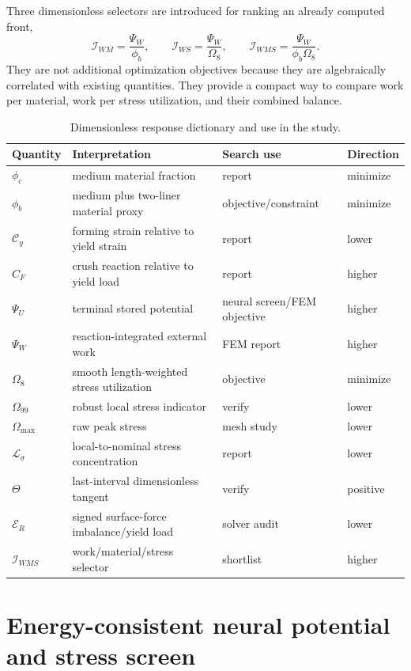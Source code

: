 \documentclass[11pt]{article}
\newcommand{\phib}{\phi_{b}}
\newcommand{\phic}{\phi_{c}}
\newcommand{\PsiU}{\Psi_{U}}
\newcommand{\PsiW}{\Psi_{W}}
\newcommand{\Om}{\Omega_{8}}
\newcommand{\Ommax}{\Omega_{\max}}
\newcommand{\Iws}{\mathcal I_{WMS}}
\begin{document}
Three dimensionless selectors are introduced for ranking an already computed front,
\begin{equation}
\mathcal I_{WM}=\frac{\PsiW}{\phib},\qquad
\mathcal I_{WS}=\frac{\PsiW}{\Om},\qquad
\Iws=\frac{\PsiW}{\phib\Om}.
\label{eq:selectors}
\end{equation}
They are not additional optimization objectives because they are algebraically correlated with existing quantities. They provide a compact way to compare work per material, work per stress utilization, and their combined balance.

\begin{table}[t]
\centering\small
\caption{Dimensionless response dictionary and use in the study.}
\label{tab:dimensionless_dictionary}
\begin{tabularx}{\textwidth}{lXll}
\toprule
Quantity & Interpretation & Search use & Direction \\
\midrule
$\phic$ & medium material fraction & report & minimize \\
$\phib$ & medium plus two-liner material proxy & objective/constraint & minimize \\
$\mathcal C_y$ & forming strain relative to yield strain & report & lower \\
$C_F$ & crush reaction relative to yield load & report & higher \\
$\PsiU$ & terminal stored potential & neural screen/FEM objective & higher \\
$\PsiW$ & reaction-integrated external work & FEM report & higher \\
$\Om$ & smooth length-weighted stress utilization & objective & minimize \\
$\Omega_{99}$ & robust local stress indicator & verify & lower \\
$\Ommax$ & raw peak stress & mesh study & lower \\
$\mathcal L_\sigma$ & local-to-nominal stress concentration & report & lower \\
$\Theta$ & last-interval dimensionless tangent & verify & positive \\
$\mathcal E_R$ & signed surface-force imbalance/yield load & solver audit & lower \\
$\Iws$ & work/material/stress selector & shortlist & higher \\
\bottomrule
\end{tabularx}
\end{table}

\section{Energy-consistent neural potential and stress screen}
\end{document}
